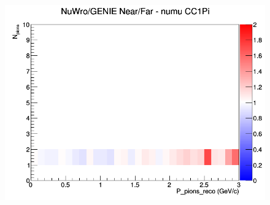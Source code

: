 \documentclass[12pt]{article}
\begin{document}
\begin{figure}[h]
\endminipage
{}
\includegraphics[width=\linewidth]{eff_N_P/GAr/pions/ratios/CC1Pi_NuWro_GENIE_numu_NF_N_P.png}
\endminipage
\newline
\end{figure}
\clearpage
\end{document}
